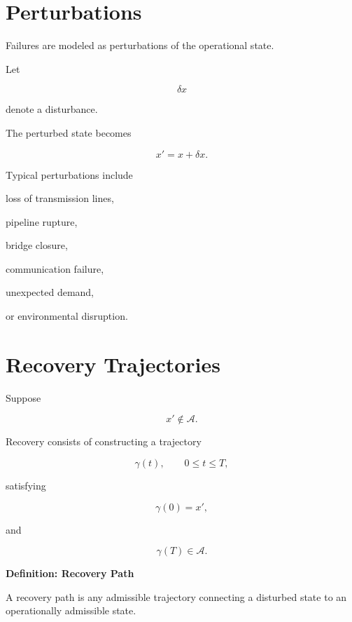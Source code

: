 \documentclass[11pt,fleqn]{book}
\numberwithin{equation}{chapter}
\newenvironment{definition}[1]
  {\begin{definitionEnv}
   \noindent\textbf{Definition: #1}\par\smallskip}
  {\end{definitionEnv}}
\theoremstyle{plain}
\theoremstyle{definition}
\theoremstyle{remark}
\begin{document}

\section{Perturbations}

Failures are modeled as perturbations of the operational state.

Let

\[
\delta x
\]

denote a disturbance.

The perturbed state becomes

\[
x'
=
x+\delta x.
\]

Typical perturbations include

loss of transmission lines,

pipeline rupture,

bridge closure,

communication failure,

unexpected demand,

or environmental disruption.


\section{Recovery Trajectories}

Suppose

\[
x'
\notin
\mathcal A.
\]

Recovery consists of constructing a trajectory

\[
\gamma(t),
\qquad
0\le t\le T,
\]

satisfying

\[
\gamma(0)=x',
\]

and

\[
\gamma(T)\in\mathcal A.
\]


\begin{definition}{Recovery Path}

A recovery path is any admissible trajectory connecting a disturbed state
to an operationally admissible state.

\end{definition}

\end{document}
